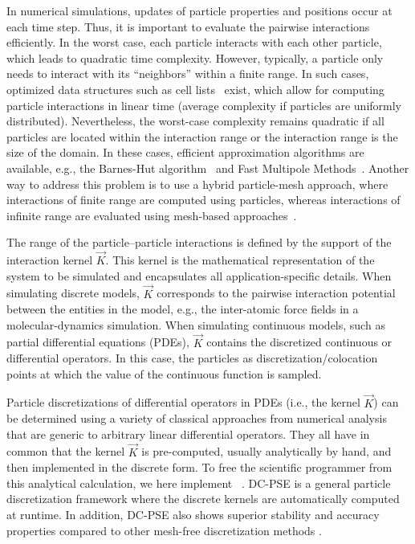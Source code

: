 In numerical simulations, updates of particle properties and positions occur at each time step. Thus, it is important
to evaluate the pairwise interactions efficiently. In the worst case, each particle interacts with each other 
particle, which leads to quadratic time complexity. However, typically, a particle only needs to interact with its
``neighbors'' within a finite range. In such cases, optimized data structures such as cell lists~\cite{Hockney_1988} 
exist, which allow for computing particle interactions in linear time (average complexity if particles are 
uniformly distributed). Nevertheless, the worst-case complexity remains quadratic if all particles are located
within the interaction range or the interaction range is the size of the domain. In these cases, efficient approximation algorithms
are available, e.g., the Barnes-Hut algorithm~\cite{Barnes_1986} and Fast Multipole Methods~\cite{Greengard_1987}.
Another way to address this problem is to use a hybrid particle-mesh approach, where interactions
of finite range are computed using particles, whereas interactions of infinite range are evaluated  
using mesh-based approaches~\cite{Hockney_1988}. 

The range of the particle--particle interactions is defined by the support of the interaction kernel $\vec{K}$. 
This kernel is the mathematical representation of the system to be simulated and encapsulates all application-specific details. 
When simulating discrete models, $\vec{K}$ corresponds to the pairwise interaction potential between the entities in the model, e.g., the inter-atomic force fields in a molecular-dynamics simulation. When simulating continuous models, such as partial differential equations (PDEs), $\vec{K}$ contains the discretized continuous or differential operators. In this case, the particles as discretization/colocation points at which the value of the continuous function is sampled. 

Particle discretizations of differential operators in PDEs (i.e., the kernel $\vec{K}$) can be determined using a variety of classical approaches from numerical analysis ~\cite{Lucy_1977,liu1995reproducing,belytschko_1994,lancaster1981surfaces,broomhead1988radial,Degond_1989,Eldredge_2002} that are generic to arbitrary linear differential operators. They all have in common that the kernel $\vec{K}$ is pre-computed, usually analytically by hand, and then implemented in the discrete form. To free the scientific programmer from this analytical calculation, we here implement ~\cite{Schrader_2010}. 
DC-PSE is a general particle discretization framework where the discrete kernels are automatically computed at runtime. In addition, DC-PSE also shows superior stability and accuracy properties compared to other mesh-free discretization methods \cite{Schrader_2010,Reboux:2012,Schrader:2012,Bourantas:2016}.

